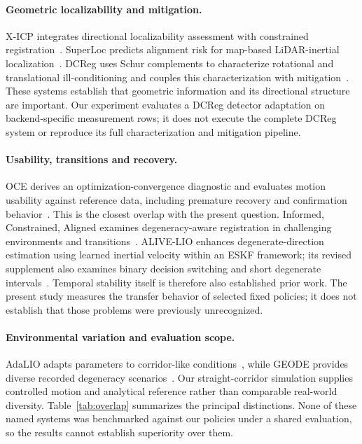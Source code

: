 \documentclass[conference]{IEEEtran}
\begin{document}
\paragraph{Geometric localizability and mitigation.}
X-ICP integrates directional localizability assessment with constrained
registration~\cite{xicp}. SuperLoc predicts alignment risk for map-based
LiDAR-inertial localization~\cite{superloc}. DCReg uses Schur complements
to characterize rotational and translational ill-conditioning and couples
this characterization with mitigation~\cite{dcreg}. These systems establish
that geometric information and its directional structure are important.
Our experiment evaluates a DCReg detector adaptation on backend-specific
measurement rows; it does not execute the complete DCReg system or reproduce
its full characterization and mitigation pipeline.

\paragraph{Usability, transitions and recovery.}
OCE derives an optimization-convergence diagnostic and evaluates motion
usability against reference data, including premature recovery and
confirmation behavior~\cite{oce}. This is the closest overlap with the
present question. Informed, Constrained, Aligned examines degeneracy-aware
registration in challenging environments and transitions~\cite{ica}.
ALIVE-LIO enhances degenerate-direction estimation using learned inertial
velocity within an ESKF framework; its revised supplement also examines binary
decision switching and short degenerate intervals~\cite{alive}. Temporal
stability itself is therefore also established prior work.
The present study measures the transfer behavior of selected fixed policies;
it does not establish that those problems were previously unrecognized.

\paragraph{Environmental variation and evaluation scope.}
AdaLIO adapts parameters to corridor-like conditions~\cite{adalio}, while
GEODE provides diverse recorded degeneracy scenarios~\cite{geode}.
Our straight-corridor simulation supplies controlled motion and analytical
reference rather than comparable real-world diversity. Table~\ref{tab:overlap}
summarizes the principal distinctions. None of these named systems was
benchmarked against our policies under a shared evaluation, so the results
cannot establish superiority over them.
\end{document}
